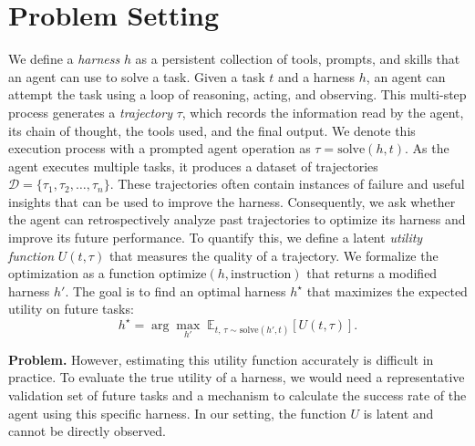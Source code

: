 \documentclass{llmxive}
\begin{document}
\section{Problem Setting}
\label{sec:setting}

We define a \textit{harness} $h$ as a persistent collection of tools, prompts, and skills that an agent can use to solve a task.
Given a task $t$ and a harness $h$, an agent can attempt the task using a loop of reasoning, acting, and observing.
This multi-step process generates a \textit{trajectory} $\tau$, which records the information read by the agent, its chain of thought, the tools used, and the final output.
We denote this execution process with a prompted agent operation as $\tau = \mathrm{solve}(h, t)$.
As the agent executes multiple tasks, it produces a dataset of trajectories $\mathcal{D} = \{\tau_1, \tau_2, \ldots, \tau_n\}$.
These trajectories often contain instances of failure and useful insights that can be used to improve the harness.
Consequently, we ask whether the agent can retrospectively analyze past trajectories to optimize its harness and improve its future performance.
To quantify this, we define a latent \textit{utility function} $U(t, \tau)$ that measures the quality of a trajectory.
We formalize the optimization as a function $\mathrm{optimize}(h, \text{instruction})$ that returns a modified harness $h'$.
The goal is to find an optimal harness $h^\star$ that maximizes the expected utility on future tasks:
\vspace{-0.5em}
\[
    h^\star = \arg\max_{h'} \; \mathbb{E}_{t,\, \tau \sim \mathrm{solve}(h', t)}
    \left[ U(t, \tau) \right].
\]

\noindent\textbf{Problem.}
However, estimating this utility function accurately is difficult in practice.
To evaluate the true utility of a harness, we would need a representative validation set of future tasks and a mechanism to calculate the success rate of the agent using this specific harness.
In our setting, the function $U$ is latent and cannot be directly observed.
\end{document}
